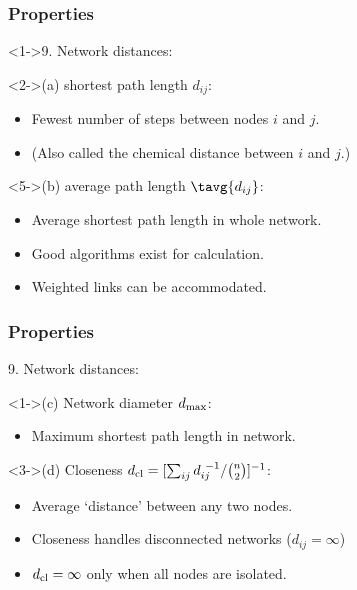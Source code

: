 \begin{frame}
  \frametitle{Properties}

  \begin{block}<1->{9. Network distances:}
    \begin{block}<2->{\alert{(a) shortest path length $d_{ij}$:}}
      \begin{itemize}
      \item <3->Fewest number of steps between nodes $i$ and $j$.      
      \item <4->(Also called the chemical distance between $i$ and $j$.)
      \end{itemize}
    \end{block}
    \begin{block}<5->{\alert{(b) average path length $\tavg{d_{ij}}$:}}
      \begin{itemize}
      \item <6-> Average shortest path length in whole network.
      \item <7-> 
        Good algorithms exist for calculation.
      \item <8->
        Weighted links can be accommodated.
      \end{itemize}
    \end{block}

  \end{block}

\end{frame}

\begin{frame}
  \frametitle{Properties}

  \begin{block}{9. Network distances:}
    \begin{block}<1->{\alert{(c) Network diameter $d_{\rm max}$:}}
      \begin{itemize}
      \item<2->
        Maximum shortest path length in network.
      \end{itemize}
    \end{block}
    \begin{block}<3->{\alert{(d) Closeness $d_{\rm cl} = [\sum_{ij} d_{ij}^{\ -1} / \binom{n}{2}]^{-1}$:}}
      \begin{itemize}
      \item<4-> 
        Average `distance' between any two nodes.
      \item<5->
        Closeness handles disconnected networks ($d_{ij}=\infty$)
      \item<6->
        $d_{\rm cl} = \infty$ only when all nodes are isolated.
      \end{itemize}
    \end{block}
  \end{block}

\end{frame}

